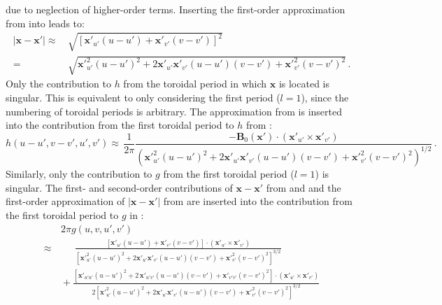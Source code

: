 due to neglection of higher-order terms.
Inserting the first-order approximation from  into  leads to:
\begin{align}
  |\mathbf{x}-\mathbf{x}'|
  \approx &\, \sqrt{ \left[ \mathbf{x}'_{u'} (u-u') + \mathbf{x}'_{v'} (v-v') \right]^2 } \nonumber \\
      =   &\, \sqrt{ {\mathbf{x}'}^2_{u'} (u-u')^2 + 2 \mathbf{x}'_{u'} \mathbf{x}'_{v'} (u-u') (v-v') + {\mathbf{x}'}^2_{v'} (v-v')^2 } \, . \label{eqn:approx_dist}
\end{align}
Only the contribution to $h$ from the toroidal period in which $\mathbf{x}$ is located is singular.
This is equivalent to only considering the first period ($l=1$), since the numbering of toroidal periods is arbitrary.
The approximation from  is inserted
into the contribution from the first toroidal period to $h$ from :
\begin{equation}
  h(u-u',v-v',u',v')
  \approx\, \frac{1}{2 \pi}
  \frac{- \mathbf{B}_0(\mathbf{x}') \cdot \left( \mathbf{x}'_{u'} \times \mathbf{x}'_{v'} \right)}
       {\left( {\mathbf{x}'}^2_{u'} (u-u')^2 + 2 \mathbf{x}'_{u'} \mathbf{x}'_{v'} (u-u') (v-v') + {\mathbf{x}'}^2_{v'} (v-v')^2 \right)^{1/2}} \, . \label{eqn:approx_h}
\end{equation}
Similarly, only the contribution to $g$ from the first toroidal period ($l=1$) is singular.
The first- and second-order contributions of $\mathbf{x}-\mathbf{x}'$ from  and 
and the first-order approximation of $|\mathbf{x}-\mathbf{x}'|$ from 
are inserted into the contribution from the first toroidal period to $g$ in :
\begin{align}
  ~ &\, 2 \pi g(u,v,u',v') \nonumber \\
  \approx &\, \phantom{+}~\frac{  \left[ \mathbf{x}'_{u'} (u-u') + \mathbf{x}'_{v'} (v-v') \right] \cdot \left( \mathbf{x}'_{u'} \times \mathbf{x}'_{v'} \right)}
                               {  \left[ {\mathbf{x}'}^2_{u'} (u-u')^2 + 2 \mathbf{x}'_{u'} \mathbf{x}'_{v'} (u-u') (v-v') + {\mathbf{x}'}^2_{v'} (v-v')^2 \right]^{3/2}} \label{eqn:g_1stOrder} \\
     ~    &\,          +  \frac{  \left[ \mathbf{x}'_{u' u'} (u-u')^2 + 2\, \mathbf{x}'_{u' v'} (u-u') (v-v') + \mathbf{x}'_{v' v'} (v-v')^2 \right] \cdot \left( \mathbf{x}'_{u'} \times \mathbf{x}'_{v'} \right)}
                               {2 \left[ {\mathbf{x}'}^2_{u'} (u-u')^2 + 2 \mathbf{x}'_{u'} \mathbf{x}'_{v'} (u-u') (v-v') + {\mathbf{x}'}^2_{v'} (v-v')^2 \right]^{3/2}} \label{eqn:g_2ndOrder}
\end{align}
